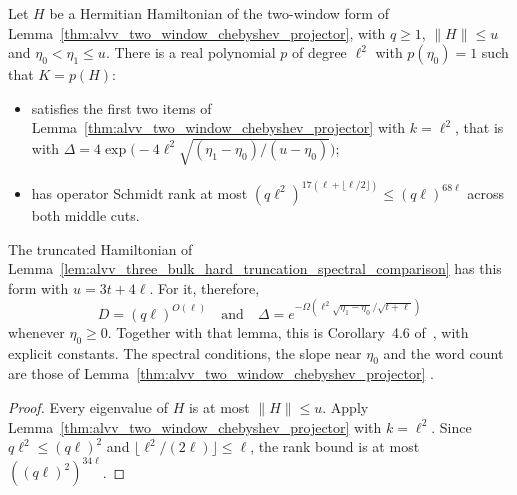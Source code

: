 \begin{lemma}
    \label{cor:alvv_good_projector_hard_truncation}
    \leanok
    Let $H$ be a Hermitian Hamiltonian of the two-window form of
    Lemma~\ref{thm:alvv_two_window_chebyshev_projector}, with $q\ge1$,
    $\|H\|\le u$ and $\eta_0<\eta_1\le u$. There is a real polynomial $p$ of
    degree $\ell^2$ with $p(\eta_0)=1$ such that $K=p(H)$:
    \begin{itemize}
        \item satisfies the first two items of
              Lemma~\ref{thm:alvv_two_window_chebyshev_projector} with
              $k=\ell^2$, that is with
              $\Delta=4\exp\bigl(-4\ell^2\sqrt{(\eta_1-\eta_0)/(u-\eta_0)}\bigr)$;
        \item has operator Schmidt rank at most
              $(q\ell^2)^{17(\ell+\lfloor\ell/2\rfloor)}\le(q\ell)^{68\ell}$ across
              both middle cuts.
    \end{itemize}
    The truncated Hamiltonian of
    Lemma~\ref{lem:alvv_three_bulk_hard_truncation_spectral_comparison} has
    this form with $u=3t+4\ell$. For it, therefore,
    \[
        D=(q\ell)^{O(\ell)}
        \quad\text{and}\quad
        \Delta=e^{-\Omega(\ell^2\sqrt{\eta_1-\eta_0}/\sqrt{t+\ell})}
    \]
    whenever $\eta_0\ge0$. Together with that lemma, this is Corollary~4.6
    of~\cite{Arad2016RigorousRG}, with explicit constants. The spectral
    conditions, the slope near $\eta_0$ and the word count are those of
    Lemma~\ref{thm:alvv_two_window_chebyshev_projector}
    \cite{gap:alvv16_spectral_projector_boundary,
        gap:alvv16_chebyshev_filter_positivity,
        gap:alvv16_chebyshev_near_ground_slope,
        gap:aklv13_interpolation_and_word_count}.
\end{lemma}
\begin{proof}\leanok
    Every eigenvalue of $H$ is at most $\|H\|\le u$. Apply
    Lemma~\ref{thm:alvv_two_window_chebyshev_projector} with $k=\ell^2$.
    Since $q\ell^2\le(q\ell)^2$ and $\lfloor\ell^2/(2\ell)\rfloor\le\ell$, the
    rank bound is at most $((q\ell)^2)^{34\ell}$.
\end{proof}

